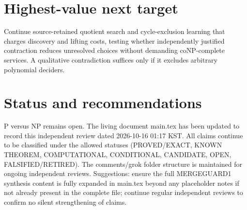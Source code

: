 \documentclass[11pt]{article}
\begin{document}
\section{Highest-value next target}
Continue source-retained quotient search and cycle-exclusion learning that charges discovery and lifting costs, testing whether independently justified contraction reduces unresolved choices without demanding coNP-complete services. A qualitative contradiction suffices only if it excludes arbitrary polynomial deciders.

\section{Status and recommendations}
P versus NP remains open. The living document main.tex has been updated to record this independent review dated 2026-10-16 01:17 KST. All claims continue to be classified under the allowed statuses (PROVED/EXACT, KNOWN THEOREM, COMPUTATIONAL, CONDITIONAL, CANDIDATE, OPEN, FALSIFIED/RETIRED). The comments/grok folder structure is maintained for ongoing independent reviews. Suggestions: ensure the full MERGEGUARD1 synthesis content is fully expanded in main.tex beyond any placeholder notes if not already present in the complete file; continue regular independent reviews to confirm no silent strengthening of claims.

\end{document}
